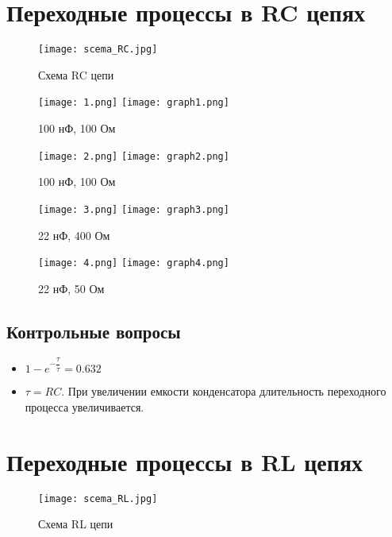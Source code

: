 \documentclass[a4paper,14pt]{article}
\begin{document}


\section{Переходные процессы в RC цепях}

\begin{figure}[H]
	\centering
	\texttt{[image: scema\_RC.jpg]}
	\caption{Схема RC цепи}	
\end{figure}


\begin{figure}[H]
	\centering
	\texttt{[image: 1.png]}
	\texttt{[image: graph1.png]}
	\caption{100 нФ, 100 Ом}	
\end{figure}

\begin{figure}[H]
	\centering
	\texttt{[image: 2.png]}
	\texttt{[image: graph2.png]}
	\caption{100 нФ, 100 Ом}	
\end{figure}

\begin{figure}[H]
	\centering
	\texttt{[image: 3.png]}
	\texttt{[image: graph3.png]}
	\caption{22 нФ, 400 Ом}	
\end{figure}

\begin{figure}[H]
	\centering
	\texttt{[image: 4.png]}
	\texttt{[image: graph4.png]}
	\caption{22 нФ, 50 Ом}	
\end{figure}

\subsection{Контрольные вопросы}
\begin{itemize}
	\item $1 - e^{-\dfrac{\tau}{\tau}} = 0.632$
	\item $\tau = RC$. При увеличении емкости конденсатора длительность переходного процесса увеличивается.
\end{itemize}


\section{Переходные процессы в RL цепях}

\begin{figure}[H]
	\centering
	\texttt{[image: scema\_RL.jpg]}
	\caption{Схема RL цепи}	
\end{figure}
\end{document}
